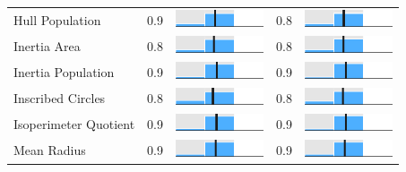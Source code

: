 \begin{table}
\begin{tabular}{l rm{7em} rm{7em}}
Hull Population        &   0.9 &       \includegraphics[width=7em]{mini_hist/LA_2012_hull_p} &   0.8 &       \includegraphics[width=7em]{mini_hist/LA_2016_hull_p} \\
Inertia Area           &   0.8 &    \includegraphics[width=7em]{mini_hist/LA_2012_inertia_a} &   0.8 &    \includegraphics[width=7em]{mini_hist/LA_2016_inertia_a} \\
Inertia Population     &   0.9 &    \includegraphics[width=7em]{mini_hist/LA_2012_inertia_p} &   0.9 &    \includegraphics[width=7em]{mini_hist/LA_2016_inertia_p} \\
Inscribed Circles      &   0.8 &    \includegraphics[width=7em]{mini_hist/LA_2012_ehrenburg} &   0.8 &    \includegraphics[width=7em]{mini_hist/LA_2016_ehrenburg} \\
Isoperimeter Quotient  &   0.9 &       \includegraphics[width=7em]{mini_hist/LA_2012_polsby} &   0.9 &       \includegraphics[width=7em]{mini_hist/LA_2016_polsby} \\
Mean Radius            &   0.9 &  \includegraphics[width=7em]{mini_hist/LA_2012_mean_radius} &   0.9 &  \includegraphics[width=7em]{mini_hist/LA_2016_mean_radius} \\

\end{tabular}
\end{table}

